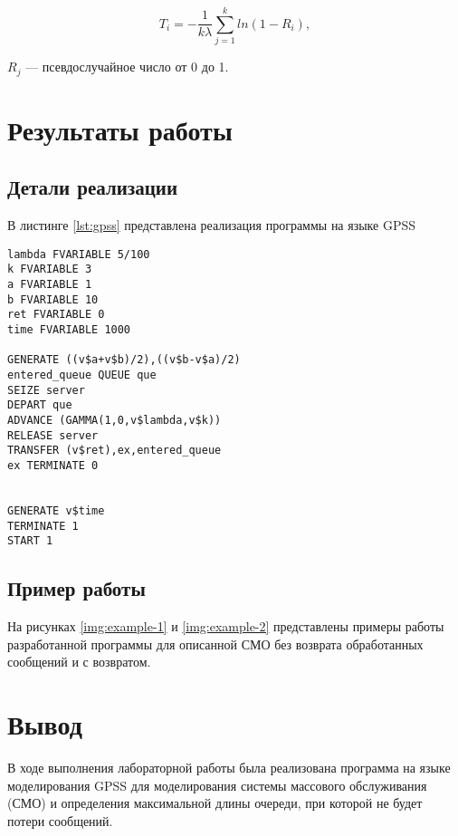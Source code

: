 \begin{equation}
	T_{i} = - \frac{1}{k \lambda} \sum_{j = 1}^{k} ln (1 - R_i),
\end{equation}

 $R_j$ --- псевдослучайное число от 0 до 1.

\section*{Результаты работы}

\subsection*{Детали реализации}

В листинге \ref{lst:gpss} представлена реализация программы на языке GPSS
\clearpage

\begin{center}
\captionsetup{justification=raggedright,singlelinecheck=off}
\begin{lstlisting}[label=lst:gpss,caption=Реализация программы на языке GPSS]
lambda FVARIABLE 5/100
k FVARIABLE 3
a FVARIABLE 1
b FVARIABLE 10
ret FVARIABLE 0
time FVARIABLE 1000

GENERATE ((v$a+v$b)/2),((v$b-v$a)/2)
entered_queue QUEUE que
SEIZE server
DEPART que
ADVANCE (GAMMA(1,0,v$lambda,v$k))
RELEASE server
TRANSFER (v$ret),ex,entered_queue
ex TERMINATE 0


GENERATE v$time
TERMINATE 1
START 1
\end{lstlisting}
\end{center}

\subsection*{Пример работы}

На рисунках \ref{img:example-1} и \ref{img:example-2} представлены примеры работы разработанной программы для описанной СМО без возврата обработанных сообщений и с возвратом.



\clearpage

\section*{Вывод}

В ходе выполнения лабораторной работы была реализована программа на языке моделирования GPSS для моделирования системы массового обслуживания (СМО) и определения максимальной длины очереди, при которой не будет потери сообщений. 

